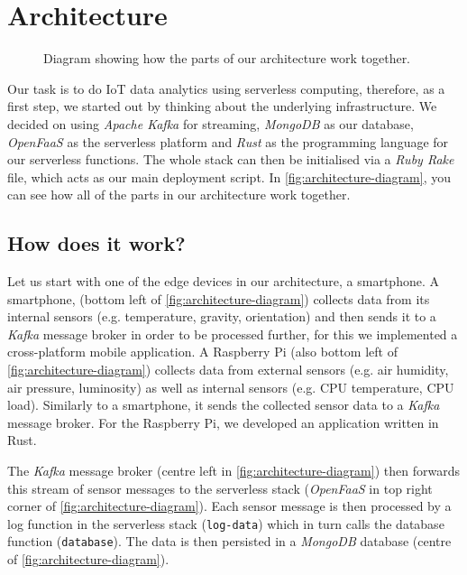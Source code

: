 \chapter{Architecture}
\label{sec:architecture}

\begin{figure}[H]
  \caption{Diagram showing how the parts of our architecture work together.
    \nocite{smartphone-icon, browser-icon}
  }
  \label{fig:architecture-diagram}
\end{figure}

Our task is to do IoT data analytics using serverless computing, therefore, as a first step, we
started out by thinking about the underlying infrastructure. We decided on using \textit{Apache
Kafka} for streaming, \textit{MongoDB} as our database, \textit{OpenFaaS} as the serverless platform
and \textit{Rust} as the programming language for our serverless functions. The whole stack can then
be initialised via a \textit{Ruby Rake} file, which acts as our main deployment script. In
\autoref{fig:architecture-diagram}, you can see how all of the parts in our architecture work
together.

\section{How does it work?}

Let us start with one of the edge devices in our architecture, a smartphone. A smartphone, (bottom
left of \autoref{fig:architecture-diagram}) collects data from its internal sensors (e.g.
temperature, gravity, orientation) and then sends it to a \textit{Kafka} message broker in order to
be processed further, for this we implemented a cross-platform mobile application. A Raspberry Pi
(also bottom left of \autoref{fig:architecture-diagram}) collects data from external sensors (e.g.
air humidity, air pressure, luminosity) as well as internal sensors (e.g. CPU temperature, CPU
load). Similarly to a smartphone, it sends the collected sensor data to a \textit{Kafka} message
broker. For the Raspberry Pi, we developed an application written in Rust.

The \textit{Kafka} message broker (centre left in \autoref{fig:architecture-diagram}) then forwards
this stream of sensor messages to the serverless stack (\textit{OpenFaaS} in top right corner of
\autoref{fig:architecture-diagram}). Each sensor message is then processed by a log function in the
serverless stack (\texttt{log-data}) which in turn calls the database function (\texttt{database}).
The data is then persisted in a \textit{MongoDB} database (centre of
\autoref{fig:architecture-diagram}).

